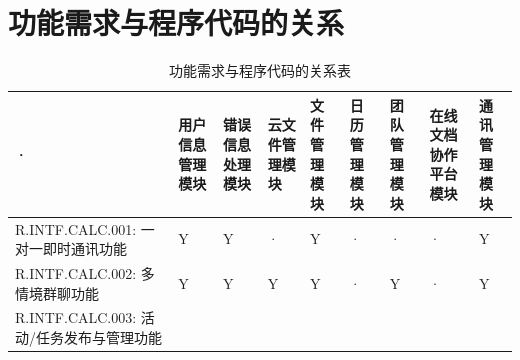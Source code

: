 \section{功能需求与程序代码的关系}
    \begin{table}[htbp]
        \centering
        \small
        \caption{功能需求与程序代码的关系表} \label{tab:requirement-module}
            \begin{tabular}{|p{9em}|p{2.5em}|p{2.5em}|p{2.5em}|p{2.5em}|p{2.5em}|
                            p{2.5em}|p{2.5em}|p{2.5em}|}
            \hline %
            ·   & 用户信息管理模块      & 错误信息处理模块  & 云文件管理模块 
                & 文件管理模块          & 日历管理模块      & 团队管理模块      
                & 在线文档协作平台模块  & 通讯管理模块\\
            \hline %
            R.INTF.CALC.001: 一对一即时通讯功能
                & Y                     & Y                 & · 
                & Y                     & ·                 & · 
                & ·                     & Y                 \\
            \hline  %
            R.INTF.CALC.002: 多情境群聊功能
                & Y                     & Y                 & Y
                & Y                     & ·                 & Y 
                & ·                     & Y                 \\
            \hline %
            R.INTF.CALC.003: 活动/任务发布与管理功能

\end{tabular}
\end{table}
